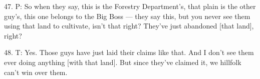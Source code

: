 47. P: So when they say, this is the Forestry Department's, that plain is the other
guy's, this one belongs to the Big Boss --- they say this, but you never see them
using that land to cultivate, isn't that right? They've just abandoned [that land],
right?

48. T: Yes. Those guys have just laid their claims like that. And I don't see them
ever doing anything [with that land]. But since they've claimed it, we hillfolk
can't win over them.

